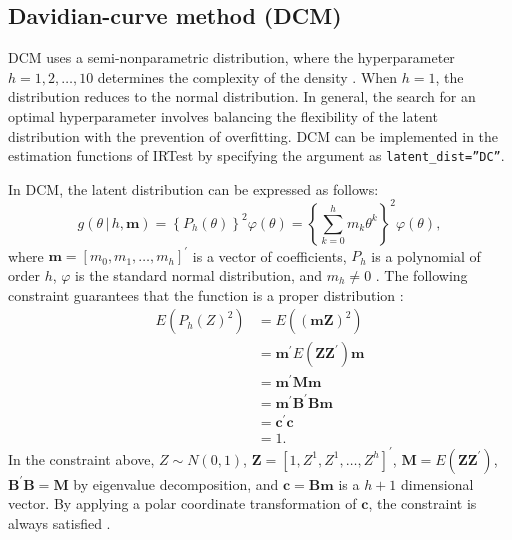 \hypertarget{davidian-curve-method-dcm}{%
\subsection{Davidian-curve method (DCM)}\label{davidian-curve-method-dcm}}

DCM uses a semi-nonparametric distribution, where the hyperparameter
\(h = 1, 2, \dots, 10\) determines the complexity of the density
\citep{Woods+Lin:2009}. When \(h = 1\), the distribution reduces to the normal
distribution. In general, the search for an optimal hyperparameter
involves balancing the flexibility of the latent distribution with the
prevention of overfitting. DCM can be implemented in the estimation
functions of IRTest by specifying the argument as \texttt{latent\_dist=”DC”}.

In DCM, the latent distribution can be expressed as follows:
\[g{\left( \theta \, | \, h, \mathrm{\mathbf{m}}\right)} =
\left\{ P_{h}{( \theta )} \right\}^{2} \varphi{(\theta)} =
\left\{ \sum_{k = 0}^{h}{m_{k} \theta^{k}} \right\}^{2} \varphi{(\theta)} ,
\label{eq:dcm}\] where
\(\mathrm{\mathbf{m}} = \left[ m_0, m_1, \dots, m_h \right]^{'}\) is a
vector of coefficients, \(P_h\) is a polynomial of order \(h\), \(\varphi\) is
the standard normal distribution, and \(m_h \ne 0\)
\citep{Woods+Lin:2009, Zhang+Davidian:2001}. The following constraint
guarantees that the function is a proper distribution
\citep{Zhang+Davidian:2001}: \[\begin{split}
E{\left( P_{h}{(Z)^{2}}\right)}
&= E{\left( (\mathrm{\mathbf{mZ}} )^{2}\right)} \\
&= \mathrm{\mathbf{m}}^{'} E{\left( \mathrm{\mathbf{ZZ}}^{'} \right)} \mathrm{\mathbf{m}} \\
&= \mathrm{\mathbf{m}}^{'} \mathrm{\mathbf{Mm}} \\
&= \mathrm{\mathbf{m}}^{'} \mathrm{\mathbf{B}}^{'} \mathrm{\mathbf{Bm}} \\
&= \mathrm{\mathbf{c}}^{'} \mathrm{\mathbf{c}} \\
&= 1.
\end{split}
\label{eq:constraint}\] In the constraint above, \(Z \sim N{(0, 1)}\),
\(\mathrm{\mathbf{Z}} = \left[ 1, Z^1, Z^1, \dots, Z^h \right]^{'}\),
\(\mathrm{\mathbf{M}} = E{\left( \mathrm{\mathbf{ZZ}}^{'} \right)}\),
\(\mathrm{\mathbf{B}}^{'} \mathrm{\mathbf{B}} = \mathrm{\mathbf{M}}\) by
eigenvalue decomposition, and
\(\mathrm{\mathbf{c}} = \mathrm{\mathbf{Bm}}\) is a \(h + 1\) dimensional
vector. By applying a polar coordinate transformation of
\(\mathrm{\mathbf{c}}\), the constraint is always satisfied \citep[see][]{Woods+Lin:2009, Zhang+Davidian:2001}.


